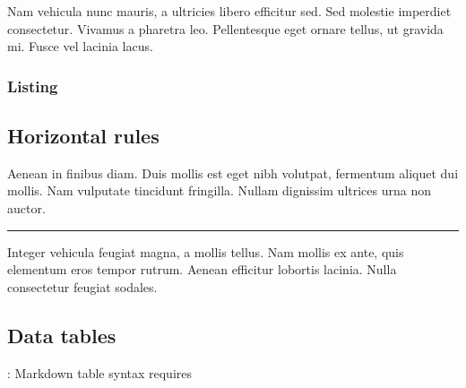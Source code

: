 \documentclass[letterpaper,10pt,english]{sphinxmanual}
\begin{document}
Nam vehicula nunc  mauris, a ultricies libero efficitur
sed. Sed molestie imperdiet consectetur. Vivamus a pharetra leo. Pellentesque
eget ornare tellus, ut gravida mi. Fusce vel lacinia lacus.


\subsubsection{Listing}
\label{\detokenize{markdown:listing}}
\begin{sphinxVerbatim}[commandchars=\\\{\}]
    
           
       \PYG{p}{[}\PYG{p}{]}
         
      \PYG{p}{[}\PYG{p}{]}  \PYG{p}{[}\PYG{p}{]}
   
\end{sphinxVerbatim}


\subsection{Horizontal rules}
\label{\detokenize{markdown:horizontal-rules}}
Aenean in finibus diam. Duis mollis est eget nibh volutpat, fermentum aliquet
dui mollis. Nam vulputate tincidunt fringilla. Nullam dignissim ultrices urna
non auctor.


\bigskip\hrule\bigskip


Integer vehicula feugiat magna, a mollis tellus. Nam mollis ex ante, quis
elementum eros tempor rutrum. Aenean efficitur lobortis lacinia. Nulla
consectetur feugiat sodales.


\subsection{Data tables}
\label{\detokenize{markdown:data-tables}}
: Markdown table syntax requires 
\end{document}
